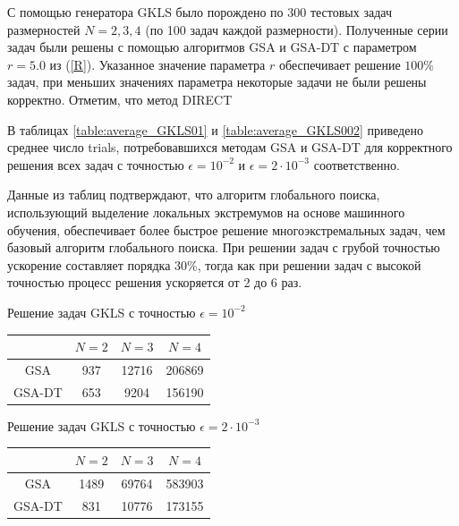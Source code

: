 \documentclass[entropy,article,submit,moreauthors,pdftex]{Definitions/mdpi}
\begin{document}
С помощью генератора GKLS было порождено по 300 тестовых задач размерностей $N=2,3,4$ (по 100 задач каждой размерности).
Полученные серии задач были решены с помощью алгоритмов GSA и GSA-DT с параметром $r=5.0$ из (\ref{R}). Указанное значение параметра $r$ обеспечивает решение $100\%$ задач, при меньших значениях параметра некоторые задачи не были решены корректно. Отметим, что метод DIRECT 

В таблицах \ref{table:average_GKLS01} и \ref{table:average_GKLS002} приведено среднее число trials, потребовавшихся методам GSA и GSA-DT для корректного решения всех задач с точностью $\epsilon = 10^{-2}$ и $\epsilon = 2 \cdot 10^{-3}$ соответственно.

Данные из таблиц подтверждают, что алгоритм глобального поиска, использующий выделение локальных экстремумов на основе машинного обучения, обеспечивает более быстрое решение многоэкстремальных задач, чем базовый алгоритм глобального поиска. При решении задач с грубой точностью ускорение составляет порядка $30\%$, тогда как при решении задач с высокой точностью процесс решения ускоряется от 2 до 6 раз. 

\begin{specialtable}[H] 
	\caption{Решение задач GKLS с точностью $\epsilon = 10^{-2}$}\label{table:average_GKLS01}
	\center
\begin{tabular}{cccc}
\toprule
        & $N=2$ & $N=3$  & $N=4$    \\
\midrule
GSA     &  937  &  12716 &  206869  \\
GSA-DT  &  653  &  9204  &  156190  \\
\bottomrule
\end{tabular}
\end{specialtable}

\begin{specialtable}[H] 
	\caption{Решение задач GKLS с точностью $\epsilon = 2 \cdot 10^{-3}$}\label{table:average_GKLS002}
	\center
\begin{tabular}{cccc}
\toprule

       & $N=2$ & $N=3$  & $N=4$    \\
\midrule
GSA    & 1489  & 69764  & 583903  \\
GSA-DT & 831   & 10776  & 173155   \\
\bottomrule
\end{tabular}
\end{specialtable}



\end{document}
